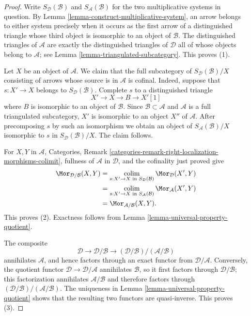 \begin{proof}
Write $S_{\mathcal{D}}(\mathcal{B})$ and
$S_{\mathcal{A}}(\mathcal{B})$ for the two multiplicative systems in
question. By Lemma \ref{lemma-construct-multiplicative-system}, an arrow
belongs to either system precisely when it occurs as the first arrow of a
distinguished triangle whose third object is isomorphic to an object of
$\mathcal{B}$. The distinguished triangles of $\mathcal{A}$ are exactly
the distinguished triangles of $\mathcal{D}$ all of whose objects belong
to $\mathcal{A}$; see Lemma \ref{lemma-triangulated-subcategory}. This
proves (1).

Let $X$ be an object of $\mathcal{A}$. We claim that the full subcategory
of $S_{\mathcal{D}}(\mathcal{B})/X$ consisting of arrows whose source is
in $\mathcal{A}$ is cofinal. Indeed, suppose that
$s : X' \to X$ belongs to $S_{\mathcal{D}}(\mathcal{B})$. Complete $s$
to a distinguished triangle
$$
X' \longrightarrow X \longrightarrow B \longrightarrow X'[1]
$$
where $B$ is isomorphic to an object of $\mathcal{B}$. Since
$\mathcal{B} \subset \mathcal{A}$ and $\mathcal{A}$ is a full
triangulated subcategory, $X'$ is isomorphic to an object $X''$ of
$\mathcal{A}$. After precomposing $s$ by such an isomorphism we obtain an
object of $S_{\mathcal{A}}(\mathcal{B})/X$ isomorphic to $s$ in
$S_{\mathcal{D}}(\mathcal{B})/X$. The claim follows.

For $X,Y$ in $\mathcal{A}$, Categories, Remark
\ref{categories-remark-right-localization-morphisms-colimit}, fullness of
$\mathcal{A}$ in $\mathcal{D}$, and the cofinality just proved give
\begin{align*}
\Mor_{\mathcal{D}/\mathcal{B}}(X,Y)
&=
\mathop{\rm colim}_{s:X'\to X\text{ in }S_{\mathcal{D}}(\mathcal{B})}
\Mor_{\mathcal{D}}(X',Y) \\
&=
\mathop{\rm colim}_{s:X'\to X\text{ in }S_{\mathcal{A}}(\mathcal{B})}
\Mor_{\mathcal{A}}(X',Y) \\
&=
\Mor_{\mathcal{A}/\mathcal{B}}(X,Y).
\end{align*}
This proves (2). Exactness follows from
Lemma \ref{lemma-universal-property-quotient}.

The composite
$$
\mathcal{D} \longrightarrow \mathcal{D}/\mathcal{B}
\longrightarrow (\mathcal{D}/\mathcal{B})/(\mathcal{A}/\mathcal{B})
$$
annihilates $\mathcal{A}$, and hence factors through an exact functor from
$\mathcal{D}/\mathcal{A}$. Conversely, the quotient functor
$\mathcal{D} \to \mathcal{D}/\mathcal{A}$ annihilates $\mathcal{B}$,
so it first factors through $\mathcal{D}/\mathcal{B}$; this factorization
annihilates $\mathcal{A}/\mathcal{B}$ and therefore factors through
$(\mathcal{D}/\mathcal{B})/(\mathcal{A}/\mathcal{B})$. The uniqueness in
Lemma \ref{lemma-universal-property-quotient} shows that the resulting
two functors are quasi-inverse. This proves (3).
\end{proof}

